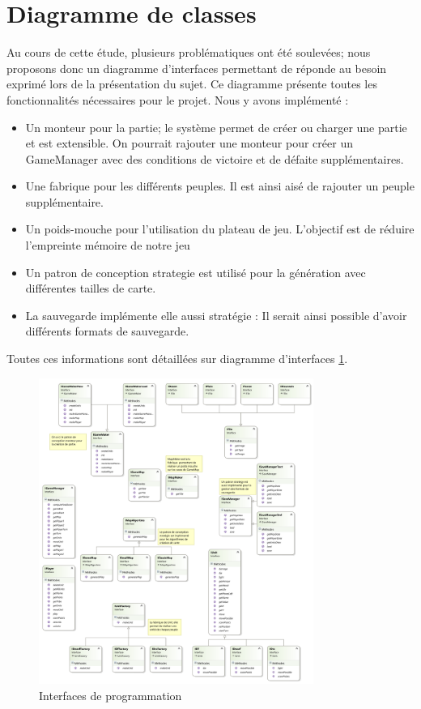 \section{Diagramme de classes}
Au cours de cette étude, plusieurs problématiques ont été soulevées; nous proposons donc un diagramme d'interfaces permettant de réponde au besoin exprimé lors de la présentation du sujet.
Ce diagramme présente toutes les fonctionnalités nécessaires pour le projet.
Nous y avons implémenté :
\begin{itemize}
  \item Un monteur pour la partie; le système permet de créer ou charger une partie et est extensible. 
		On pourrait rajouter une monteur pour créer un GameManager avec des conditions de victoire et de défaite supplémentaires.
  \item Une fabrique pour les différents peuples. Il est ainsi aisé de rajouter un peuple supplémentaire.
  \item Un poids-mouche pour l'utilisation du plateau de jeu. L'objectif est de réduire l'empreinte mémoire de notre jeu
  \item Un patron de conception strategie est utilisé pour la génération avec différentes tailles de carte.
  \item La sauvegarde implémente elle aussi stratégie : Il serait ainsi possible d'avoir différents formats de sauvegarde.
\end{itemize} 
Toutes ces informations sont détaillées sur diagramme d'interfaces \ref{fig:interfaceDiagram}.
\newline
\newline
\begin{figure}[h!]
    \centering
    \includegraphics[width=0.8\textwidth]{res/Interfaces.png}
    \caption{Interfaces de programmation}
    \label{fig:interfaceDiagram}
\end{figure}

